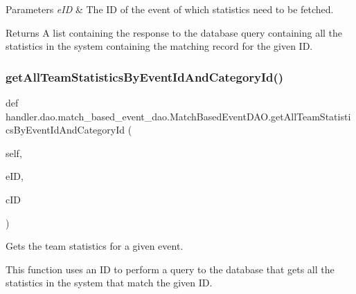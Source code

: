 \begin{DoxyParams}{Parameters}
{\em e\+ID} & The ID of the event of which statistics need to be fetched.\\
\hline
\end{DoxyParams}
\begin{DoxyReturn}{Returns}
A list containing the response to the database query containing all the statistics in the system containing the matching record for the given ID. 
\end{DoxyReturn}
\mbox{\label{classhandler_1_1dao_1_1match__based__event__dao_1_1_match_based_event_d_a_o_ace06bcd3f219262edd5fa24419df4139}} 
\subsubsection{\texorpdfstring{get\+All\+Team\+Statistics\+By\+Event\+Id\+And\+Category\+Id()}{getAllTeamStatisticsByEventIdAndCategoryId()}}
{\footnotesize\ttfamily def handler.\+dao.\+match\+\_\+based\+\_\+event\+\_\+dao.\+Match\+Based\+Event\+D\+A\+O.\+get\+All\+Team\+Statistics\+By\+Event\+Id\+And\+Category\+Id (\begin{DoxyParamCaption}\item[{}]{self,  }\item[{}]{e\+ID,  }\item[{}]{c\+ID }\end{DoxyParamCaption})}



Gets the team statistics for a given event. 

This function uses an ID to perform a query to the database that gets all the statistics in the system that match the given ID.


